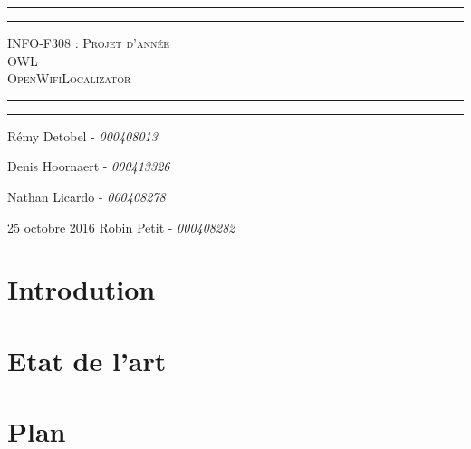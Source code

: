 \documentclass[11pt,a4paper]{article}
\title{}
\author{}
\begin{document}
\begin{center}
    \vspace*{\fill}
        \hrule
        \vspace*{2pt}
        \hrule
        \vspace*{15pt}
        \textsc{\Huge{INFO-F308 : Projet d'année \\\vspace*{8pt}
            OWL\\\vspace*{12pt}
            OpenWifiLocalizator}}
        \vspace*{15pt}
        \hrule
        \vspace*{2pt}
        \hrule
  \vspace*{\fill}
\end{center}
\null
\vfill

\large
\hfill Rémy Detobel - \emph{000408013}

\hfill Denis Hoornaert - \emph{000413326}

\hfill Nathan Licardo - \emph{000408278}

25 octobre 2016 \hfill Robin Petit - \emph{000408282}
\newpage



\section{Introdution}

\section{Etat de l'art}

\section{Plan}
\end{document}
